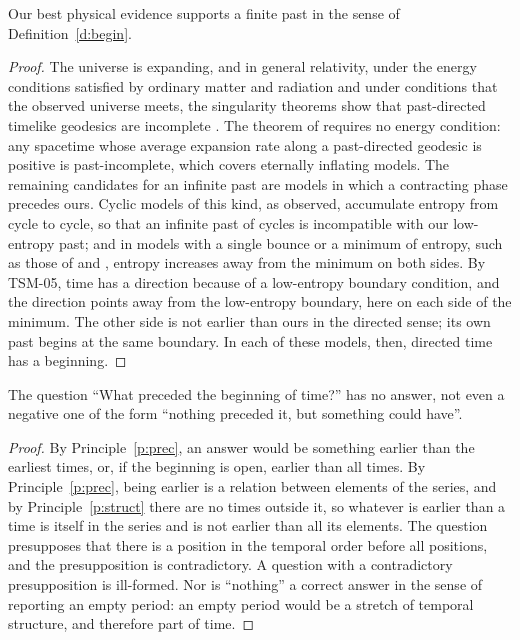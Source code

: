 \documentclass{situationist-preprint}
\begin{document}
\begin{lemma}\label{l:phys}
Our best physical evidence supports a finite past in the sense of Definition~\ref{d:begin}.
\end{lemma}

\begin{proof}
The universe is expanding, and in general relativity, under the energy conditions satisfied by ordinary matter and radiation and under conditions that the observed universe meets, the singularity theorems show that past-directed timelike geodesics are incomplete \citep{HawkingPenrose1970}. The theorem of \citet{BordeGuthVilenkin2003} requires no energy condition: any spacetime whose average expansion rate along a past-directed geodesic is positive is past-incomplete, which covers eternally inflating models. The remaining candidates for an infinite past are models in which a contracting phase precedes ours. Cyclic models of this kind, as \citet{Tolman1934} observed, accumulate entropy from cycle to cycle, so that an infinite past of cycles is incompatible with our low-entropy past; and in models with a single bounce or a minimum of entropy, such as those of \citet{CarrollChen2004} and \citet{BarbourKoslowskiMercati2014}, entropy increases away from the minimum on both sides. By TSM-05, time has a direction because of a low-entropy boundary condition, and the direction points away from the low-entropy boundary, here on each side of the minimum. The other side is not earlier than ours in the directed sense; its own past begins at the same boundary. In each of these models, then, directed time has a beginning.
\end{proof}

\begin{lemma}\label{l:ill}
The question \enquote{What preceded the beginning of time?} has no answer, not even a negative one of the form \enquote{nothing preceded it, but something could have}.
\end{lemma}

\begin{proof}
By Principle~\ref{p:prec}, an answer would be something earlier than the earliest times, or, if the beginning is open, earlier than all times. By Principle~\ref{p:prec}, being earlier is a relation between elements of the series, and by Principle~\ref{p:struct} there are no times outside it, so whatever is earlier than a time is itself in the series and is not earlier than all its elements. The question presupposes that there is a position in the temporal order before all positions, and the presupposition is contradictory. A question with a contradictory presupposition is ill-formed. Nor is \enquote{nothing} a correct answer in the sense of reporting an empty period: an empty period would be a stretch of temporal structure, and therefore part of time.
\end{proof}
\end{document}

